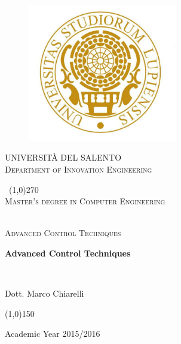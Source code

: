 \documentclass[11 pt,a4paper,twoside,openany]{book}
\begin{document}
\pagestyle{fancy}
\fancyhead{}
\fancyfoot{}
\fancyfoot[R]{\thepage}
\renewcommand{\headrulewidth}{0pt}
\renewcommand{\footrulewidth}{0.1pt}

\newpage	
\begin{titlepage}
\begin{center}
	
\begin{figure}
	\centering
	\includegraphics[height=6cm]{unigold.jpg}
\end{figure}		

\begin{center}
\begin{LARGE}
	\textsc{UNIVERSIT\`A DEL SALENTO}\\
	[0.2cm]
	\textsc{Department of Innovation Engineering}
\end{LARGE}
\end{center}	
	
	\
	\line(1,0){270} \\
	[0.25cm]
	
	\textsc{Master's degree in Computer Engineering}\
	
	\textsl{}\\
	[1cm]
	\textsc{Advanced Control Techniques}\
	
	\bigskip 
	\huge{\bfseries Advanced Control Techniques}\

	
	\bigskip
	\textsl{}\\
	[2cm]
	


\begin{LARGE}
	
	Dott. Marco Chiarelli
	
\end{LARGE}

\vspace{5cm}
	
\line(1,0){150} \\
\begin{small}
	Academic Year 2015/2016 \\
\end{small}
\end{center}
\end{titlepage}
\end{document}
